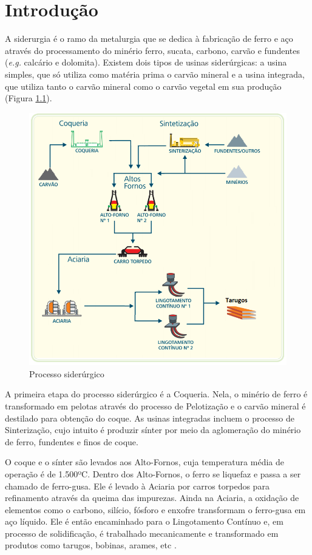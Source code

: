 \chapter[Introdução]{Introdução}

 A siderurgia é o ramo da metalurgia que se dedica à fabricação de ferro e aço  através do processamento do minério ferro, sucata, carbono, carvão e fundentes (\textit{e.g.} calcário e dolomita). Existem dois tipos de usinas siderúrgicas: a usina simples, que só utiliza como matéria prima o carvão mineral e a usina integrada, que utiliza tanto o carvão mineral como o carvão vegetal em sua produção (Figura \ref{fig:fluxogramaSiderurgia}).
 
  \begin{figure}[H]
	\centering
	\includegraphics[width=0.6\linewidth]{figuras/Steel/fluxogramaSiderurgia.png}
	\caption{Processo siderúrgico}
	\label{fig:fluxogramaSiderurgia}
\end{figure}

 A primeira etapa do processo siderúrgico é a Coqueria. Nela, o minério de ferro é transformado em pelotas através do processo de Pelotização e o carvão mineral é destilado para obtenção do coque.
%
As usinas integradas incluem o processo de Sinterização, cujo intuito é produzir sínter por meio da aglomeração do minério de ferro, fundentes e finos de coque.

 O coque e o sínter são levados aos Alto-Fornos, cuja temperatura média de operação é de 1.500ºC. Dentro dos Alto-Fornos, o ferro se liquefaz e passa a ser chamado de ferro-gusa. Ele é levado à Aciaria por carros torpedos para refinamento através da queima das impurezas. Ainda na Aciaria, a oxidação de elementos como o carbono, silício, fósforo e enxofre transformam o ferro-gusa em aço líquido. Ele é então encaminhado para o Lingotamento Contínuo e, em processo de solidificação, é trabalhado mecanicamente e transformado em produtos como tarugos, bobinas, arames, etc \cite{aco}.

